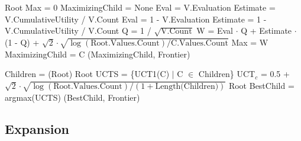 \begin{algorithm}[H]
    \begin{algorithmic}[1]
                \State \Return Root
            \EndIf
            \State Max = 0
            \State MaximizingChild = None
                    \State Eval = V.Evaluation
                    \State Estimate = V.CumulativeUtility / V.Count
                \Else 
                    \State Eval = 1 - V.Evaluation
                    \State Estimate = 1 - V.CumulativeUtility / V.Count
                \EndIf
                \State Q = 1 / $\sqrt{\text{V.Count}}$
                \State W = Eval $\cdot$ Q + Estimate $\cdot$ (1 - Q) + $\sqrt{2}\cdot\sqrt{\log(\text{Root.Values.Count}) / \text{C.Values.Count}}$
                    \State Max = W
                    \State MaximizingChild = C
                \EndIf
            \EndFor 
            \State \Return {}(MaximizingChild, Frontier)
        \EndProcedure
    \end{algorithmic}    
\end{algorithm}

\begin{algorithm}[H]
    \begin{algorithmic}[1]
            \State Children = (Root)
                \State \Return Root
            \EndIf
            \State UCTS = \{UCT1(C) $|$ C $\in$ Children\}
            \State UCT$_c$ = 0.5 + $\sqrt{2} \cdot \sqrt{\log(\text{Root.Values.Count}) / (1+\text{Length(Children)})}$
                \State \Return Root
            \Else
                \State BestChild = argmax(UCTS)
                \State \Return {}(BestChild, Frontier)
            \EndIf 
        \EndProcedure
    \end{algorithmic}    
\end{algorithm}

\newpage
\subsection*{Expansion}

